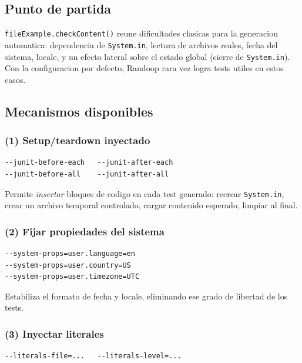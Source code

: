\documentclass[12pt,a4paper]{article}
\begin{document}
\subsection{Punto de partida}

\texttt{fileExample.checkContent()} reune dificultades clasicas para la generacion automatica:
dependencia de \texttt{System.in}, lectura de archivos reales, fecha del sistema, locale, y
un efecto lateral sobre el estado global (cierre de \texttt{System.in}). Con la
configuracion por defecto, Randoop rara vez logra tests utiles en estos casos.

\subsection{Mecanismos disponibles}

\subsubsection*{(1) Setup/teardown inyectado}

\begin{lstlisting}[style=codestyle]
--junit-before-each   --junit-after-each
--junit-before-all    --junit-after-all
\end{lstlisting}

Permite \emph{insertar} bloques de codigo en cada test generado: recrear \texttt{System.in},
crear un archivo temporal controlado, cargar contenido esperado, limpiar al final.

\subsubsection*{(2) Fijar propiedades del sistema}

\begin{lstlisting}[style=codestyle]
--system-props=user.language=en
--system-props=user.country=US
--system-props=user.timezone=UTC
\end{lstlisting}

Estabiliza el formato de fecha y locale, eliminando ese grado de libertad de los tests.

\subsubsection*{(3) Inyectar literales}

\begin{lstlisting}[style=codestyle]
--literals-file=...   --literals-level=...
\end{lstlisting}
\end{document}
